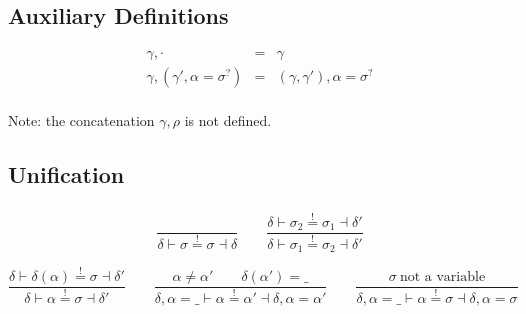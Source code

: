 \documentclass[10pt,a4paper]{article}
\newcommand\note[1]{\noindent #1}
\begin{document}
\subsection*{Auxiliary Definitions}

$$
\begin{array}{rcll}
\gamma,\cdot &=& \gamma \\
\gamma,(\gamma',\alpha{=}\sigma^?) &=& (\gamma,\gamma'),\alpha{=}\sigma^? \\
\end{array}
$$

\note{
Note: the concatenation $\gamma,\rho$ is not defined.
}



\subsection*{Unification}

\newcommand\makeeq{\stackrel!=}

\subsubsection*{\fbox{$\delta \vdash \sigma_1 \makeeq \sigma_2 \dashv \delta'$}}
\vspace{-2\baselineskip}

$$
\frac{
}{
  \delta \vdash \sigma \makeeq \sigma \dashv \delta
}
\qquad
\frac{
  \delta \vdash \sigma_2 \makeeq \sigma_1 \dashv \delta'
}{
  \delta \vdash \sigma_1 \makeeq \sigma_2 \dashv \delta'
}
$$

$$
\frac{
  \delta \vdash \delta(\alpha) \makeeq \sigma \dashv \delta'
}{
  \delta \vdash \alpha \makeeq \sigma \dashv \delta'
}
\qquad
\frac{
  \alpha \neq \alpha'
  \qquad
  \delta(\alpha') = \_
}{
  \delta,\alpha{=}\_ \vdash \alpha \makeeq \alpha' \dashv \delta,\alpha{=}\alpha'
}
\qquad
\frac{
  \sigma ~\mbox{not a variable}
}{
  \delta,\alpha{=}\_ \vdash \alpha \makeeq \sigma \dashv \delta,\alpha{=}\sigma
}
$$
\end{document}
